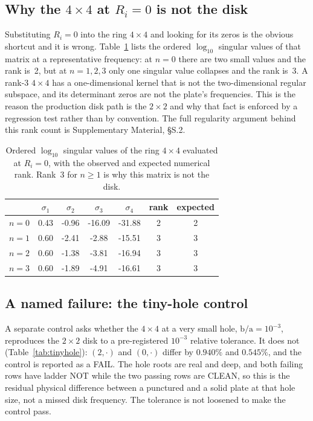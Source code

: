 \documentclass[11pt]{article}
\newcommand{\ba}{\mbox{b/a}}
\begin{document}
\subsection{Why the \texorpdfstring{$4\times4$}{4x4} at
\texorpdfstring{$R_i=0$}{Ri=0} is not the disk}\label{sec:rank}
Substituting $R_i=0$ into the ring $4\times4$ and looking for its zeros is the
obvious shortcut and it is wrong. Table~\ref{tab:ranks} lists the ordered
$\log_{10}$ singular values of that matrix at a representative frequency: at
$n=0$ there are two small values and the rank is~2, but at $n=1,2,3$ only one
singular value collapses and the rank is~3. A rank-3 $4\times4$ has a
one-dimensional kernel that is not the two-dimensional regular subspace, and
its determinant zeros are not the plate's frequencies. This is the reason the
production disk path is the $2\times2$ and why that fact is enforced by a
regression test rather than by convention. The full regularity argument
behind this rank count is Supplementary Material, \S{}S.2.

\begin{table}[htbp]\centering\small
\caption{Ordered $\log_{10}$ singular values of the ring $4\times4$ evaluated
at $R_i=0$, with the observed and expected numerical rank. Rank~3 for
$n\ge1$ is why this matrix is not the disk.}
\label{tab:ranks}
\begin{tabular}{lcccccc}
\toprule
& $\sigma_1$ & $\sigma_2$ & $\sigma_3$ & $\sigma_4$ & rank & expected\\
\midrule
$n=0$ & 0.43 & -0.96 & -16.09 & -31.88 & 2 & 2 \\
$n=1$ & 0.60 & -2.41 & -2.88 & -15.51 & 3 & 3 \\
$n=2$ & 0.60 & -1.38 & -3.81 & -16.94 & 3 & 3 \\
$n=3$ & 0.60 & -1.89 & -4.91 & -16.61 & 3 & 3 \\
\bottomrule
\end{tabular}
\end{table}

\subsection{A named failure: the tiny-hole control}\label{sec:tinyhole}
A separate control asks whether the $4\times4$ at a very small hole,
$\ba=10^{-3}$, reproduces the $2\times2$ disk to a pre-registered $10^{-3}$
relative tolerance. It does not (Table~\ref{tab:tinyhole}): $(2,\cdot)$ and
$(0,\cdot)$ differ by $0.940\%$ and $0.545\%$, and the control is reported as
a FAIL. The hole roots are real and deep, and both failing rows have ladder
NOT while the two passing rows are CLEAN, so this is the residual physical
difference between a punctured and a solid plate at that hole size, not a
missed disk frequency. The tolerance is not loosened to make the control pass.
\end{document}
